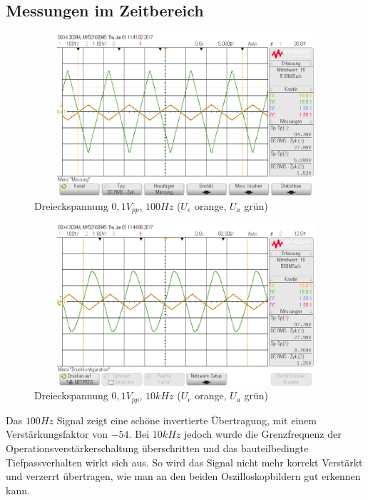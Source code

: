 \subsection{Messungen im Zeitbereich}
\begin{figure}[H]
 \begin{center}
  \includegraphics[height=6cm,width=12cm]{OsziBilder/InvVer_100Hz}
 \end{center}
 \caption{Dreieckspannung $0,1V_{pp}$, $100Hz$ ($U_e$ orange, $U_a$ grün)}
\end{figure}

\begin{figure}[H]
 \begin{center}
  \includegraphics[height=6cm,width=12cm]{OsziBilder/InvVer_10kHz}
 \end{center}
 \caption{Dreieckspannung $0,1V_{pp}$, $10kHz$ ($U_e$ orange, $U_a$ grün)}
\end{figure}
\noindent
Das $100Hz$ Signal zeigt eine schöne invertierte Übertragung, mit einem Verstärkungsfaktor von $-54$. Bei $10kHz$ jedoch
wurde die Grenzfrequenz der Operationsverstärkerschaltung überschritten und das bauteilbedingte
Tiefpassverhalten wirkt sich aus. So wird das Signal nicht mehr korrekt Verstärkt und verzerrt übertragen, wie man an den beiden Oszilloskopbildern gut erkennen kann.\\
\newpage


